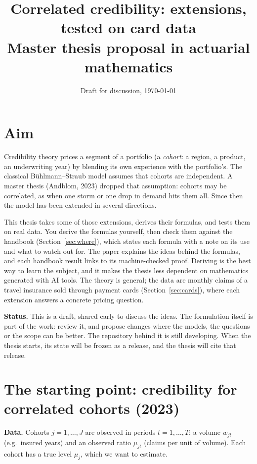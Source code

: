 \documentclass[10pt]{article}
\title{Correlated credibility: extensions, tested on card data\\[2pt]
  {\large Master thesis proposal in actuarial mathematics}}
\author{\vspace{-2em}}
\date{Draft for discussion, \today}
\begin{document}
\maketitle
\vspace{-1.5em}

\section{Aim}

Credibility theory prices a segment of a portfolio (a \emph{cohort}: a region, a product, an
underwriting year) by blending its own experience with the portfolio's. The classical
Bühlmann--Straub model assumes that cohorts are independent. A master thesis (Andblom, 2023) dropped
that assumption: cohorts may be correlated, as when one storm or one drop in demand hits them all.
Since then the model has been extended in several directions.

This thesis takes some of those extensions, derives their formulas, and tests them on real data.
You derive the formulas yourself, then check them against the handbook (Section~\ref{sec:where}),
which states each formula with a note on its use and what to watch out for. The paper explains the
ideas behind the formulas, and each handbook result links to its machine-checked proof. Deriving is the best way to learn the subject,
and it makes the thesis less dependent on mathematics generated with AI tools. The theory is
general; the data are monthly claims of a travel insurance sold through payment cards
(Section~\ref{sec:cards}), where each extension answers a concrete pricing question.

\textbf{Status.} This is a draft, shared early to discuss the ideas. The formulation itself is
part of the work: review it, and propose changes where the models, the questions or the scope can
be better. The repository behind it is still developing. When the thesis starts, its state will be
frozen as a release, and the thesis will cite that release.

\section{The starting point: credibility for correlated cohorts (2023)}

\textbf{Data.} Cohorts $j = 1, \dots, J$ are observed in periods $t = 1, \dots, T$: a volume
$w_{jt}$ (e.g.\ insured years) and an observed ratio $\mu_{jt}$ (claims per unit of volume). Each
cohort has a true level $\mu_j$, which we want to estimate.
\end{document}

